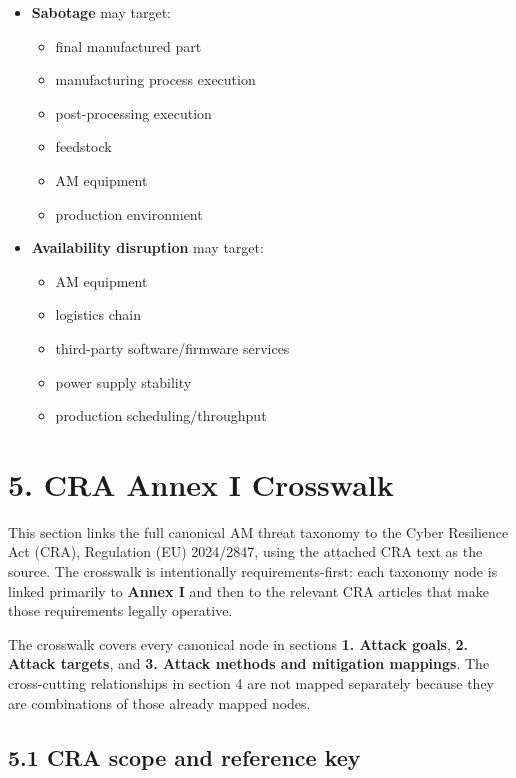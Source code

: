 \documentclass[10pt,a4paper,oneside]{report}
\begin{document}
\begin{itemize}
\item \textbf{Sabotage} may target:
\begin{itemize}
\item final manufactured part
\item manufacturing process execution
\item post-processing execution
\item feedstock
\item AM equipment
\item production environment
\end{itemize}
\end{itemize}

\begin{itemize}
\item \textbf{Availability disruption} may target:
\begin{itemize}
\item AM equipment
\item logistics chain
\item third-party software/firmware services
\item power supply stability
\item production scheduling/throughput
\end{itemize}
\end{itemize}


\chapter{5. CRA Annex I Crosswalk}


This section links the full canonical AM threat taxonomy to the Cyber Resilience Act (CRA), Regulation (EU) 2024/2847, using the attached CRA text as the source. The crosswalk is intentionally requirements-first: each taxonomy node is linked primarily to \textbf{Annex I} and then to the relevant CRA articles that make those requirements legally operative.

The crosswalk covers every canonical node in sections \textbf{1. Attack goals}, \textbf{2. Attack targets}, and \textbf{3. Attack methods and mitigation mappings}. The cross-cutting relationships in section 4 are not mapped separately because they are combinations of those already mapped nodes.


\section{5.1 CRA scope and reference key}
\end{document}
